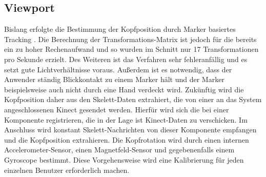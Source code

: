 \subsection{Viewport}
Bislang erfolgte die Bestimmung der Kopfposition durch Marker basiertes Tracking \cite{chilitags}. 
Die Berechnung der Transformations-Matrix ist jedoch für die \mobileDeviceComponent bereits ein zu hoher Rechenaufwand und so wurden im Schnitt nur 17 Transformationen pro Sekunde erzielt.
Des Weiteren ist das Verfahren sehr fehleranfällig und es setzt gute Lichtverhältnisse voraus.
Außerdem ist es notwendig, dass der Anwender ständig Blickkontakt zu einem Marker hält und der Marker beispielsweise auch nicht durch eine Hand verdeckt wird.
Zukünftig wird die Kopfposition daher aus den Skelett-Daten extrahiert, die von einer an das System angeschlossenen Kinect gesendet werden.
Hierfür wird sich die \mobileDeviceComponent bei einer Komponente registrieren, die in der Lage ist Kinect-Daten zu verschicken.
Im Anschluss wird \mobileDeviceComponent konstant Skelett-Nachrichten von dieser Komponente empfangen und die Kopfposition extrahieren.
Die Kopfrotation wird durch einen internen Accelerometer-Sensor, einen Magnetfeld-Sensor und gegebenenfalls einem Gyroscope bestimmt.
Diese Vorgehensweise wird eine Kalibrierung für jeden einzelnen Benutzer erforderlich machen.